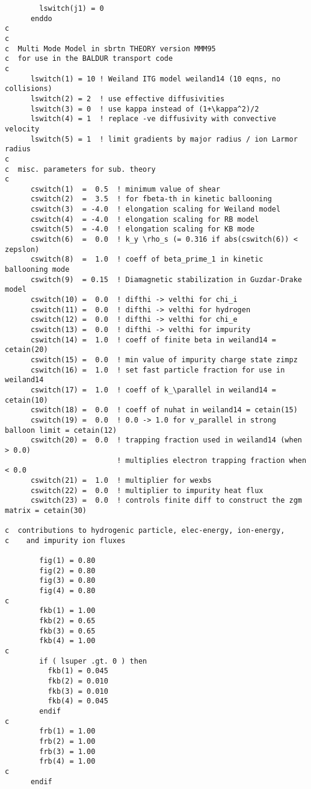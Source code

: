 \begin{verbatim}
        lswitch(j1) = 0
      enddo
c
c
c  Multi Mode Model in sbrtn THEORY version MMM95
c  for use in the BALDUR transport code
c
      lswitch(1) = 10 ! Weiland ITG model weiland14 (10 eqns, no collisions)
      lswitch(2) = 2  ! use effective diffusivities
      lswitch(3) = 0  ! use kappa instead of (1+\kappa^2)/2
      lswitch(4) = 1  ! replace -ve diffusivity with convective velocity
      lswitch(5) = 1  ! limit gradients by major radius / ion Larmor radius
c
c  misc. parameters for sub. theory
c
      cswitch(1)  =  0.5  ! minimum value of shear
      cswitch(2)  =  3.5  ! for fbeta-th in kinetic ballooning
      cswitch(3)  = -4.0  ! elongation scaling for Weiland model
      cswitch(4)  = -4.0  ! elongation scaling for RB model
      cswitch(5)  = -4.0  ! elongation scaling for KB mode
      cswitch(6)  =  0.0  ! k_y \rho_s (= 0.316 if abs(cswitch(6)) < zepslon)
      cswitch(8)  =  1.0  ! coeff of beta_prime_1 in kinetic ballooning mode
      cswitch(9)  = 0.15  ! Diamagnetic stabilization in Guzdar-Drake model
      cswitch(10) =  0.0  ! difthi -> velthi for chi_i
      cswitch(11) =  0.0  ! difthi -> velthi for hydrogen
      cswitch(12) =  0.0  ! difthi -> velthi for chi_e
      cswitch(13) =  0.0  ! difthi -> velthi for impurity
      cswitch(14) =  1.0  ! coeff of finite beta in weiland14 = cetain(20)
      cswitch(15) =  0.0  ! min value of impurity charge state zimpz
      cswitch(16) =  1.0  ! set fast particle fraction for use in weiland14
      cswitch(17) =  1.0  ! coeff of k_\parallel in weiland14 = cetain(10)
      cswitch(18) =  0.0  ! coeff of nuhat in weiland14 = cetain(15)
      cswitch(19) =  0.0  ! 0.0 -> 1.0 for v_parallel in strong balloon limit = cetain(12)
      cswitch(20) =  0.0  ! trapping fraction used in weiland14 (when > 0.0)
                          ! multiplies electron trapping fraction when < 0.0
      cswitch(21) =  1.0  ! multiplier for wexbs 
      cswitch(22) =  0.0  ! multiplier to impurity heat flux
      cswitch(23) =  0.0  ! controls finite diff to construct the zgm matrix = cetain(30)

c  contributions to hydrogenic particle, elec-energy, ion-energy,
c    and impurity ion fluxes

        fig(1) = 0.80
        fig(2) = 0.80
        fig(3) = 0.80
        fig(4) = 0.80
c
        fkb(1) = 1.00
       	fkb(2) = 0.65
        fkb(3) = 0.65
        fkb(4) = 1.00
c
        if ( lsuper .gt. 0 ) then
          fkb(1) = 0.045
          fkb(2) = 0.010
          fkb(3) = 0.010
          fkb(4) = 0.045
        endif
c
        frb(1) = 1.00
        frb(2) = 1.00
        frb(3) = 1.00
        frb(4) = 1.00
c
      endif

\end{verbatim}

